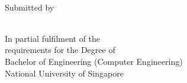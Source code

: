 
\begin{titlepage}

\begin{addmargin}[-1cm]{-3cm}

\begin{center}
\large

\hfill

\vfill


\begingroup
\color{Maroon}\spacedallcaps{\myTitle} \\ \bigskip %
\endgroup

\vfill

Submitted by \\
\spacedlowsmallcaps{\myName}
\\ %

\vfill

In partial fulfilment of the \\
requirements for the Degree of  \\
Bachelor of Engineering (Computer Engineering) \\
National University of Singapore\\


\vfill

\end{center}
\end{addmargin}

\end{titlepage}
